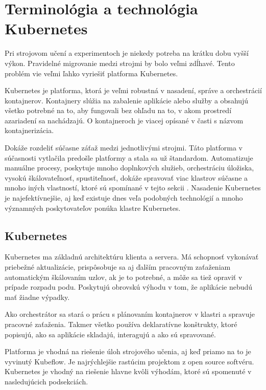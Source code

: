 
\chapter[Terminológia a technológia Kubernetes]{Terminológia a technológia\\ Kubernetes}

Pri strojovom učení a experimentoch je niekedy potreba na krátku dobu vyšší výkon. Pravidelné migrovanie medzi strojmi by bolo veľmi zdĺhavé. Tento problém vie veľmi ľahko vyriešiť platforma Kubernetes.

Kubernetes je platforma, ktorá je veľmi robustná v nasadení, správe a orchestrácií kontajnerov. Kontajnery slúžia na zabalenie aplikácie alebo služby a obsahujú všetko potrebné na to, aby fungovali bez ohľadu na to, v akom prostredí azariadení sa nachádzajú. O kontajneroch je viacej opísané v časti s názvom kontajnerizácia.

Dokáže rozdeliť súčasne záťaž medzi jednotlivými strojmi. Táto platforma v súčasnosti vytlačila predošle platformy a stala sa už štandardom. Automatizuje manuálne procesy, poskytuje mnoho doplnkových služieb, orchestráciu úložiska, vysokú škálovateľnosť, spustiteľnosť, dokáže spravovať viac klastrov súčasne a mnoho iných vlastností, ktoré sú spomínané v tejto sekcii \cite{vlastnostikub}. Nasadenie Kubernetes je najefektívnejšie, aj keď existuje dnes veľa podobných technológií a mnoho významných poskytovateľov ponúka klastre Kubernetes.

\section{Kubernetes}
Kubernetes ma základnú architektúru klienta a servera. Má schopnosť vykonávať priebežné aktualizácie, prispôsobuje sa aj ďalším pracovným zaťaženiam automatickým škálovaním uzlov, ak je to potrebné, a môže sa tiež opraviť v prípade rozpadu podu. Poskytujú obrovskú výhodu v tom, že aplikácie nebudú mať žiadne výpadky.

Ako orchestrátor sa stará o prácu s plánovaním kontajnerov v klastri a spravuje pracovné zaťaženia. Takmer všetko používa deklaratívne konštrukty, ktoré popisujú, ako sa aplikácie skladajú, interagujú a ako sú spravované.

Platforma je vhodná na riešenie úloh strojového učenia, aj keď priamo na to je vyvinutý Kubeflow. Je najrýchlejšie rastúcim projektom z open source softvéru. Kubernetes je vhodný na riešenie hlavne kvôli výhodám, ktoré sú spomenuté v nasledujúcich podsekciách.

